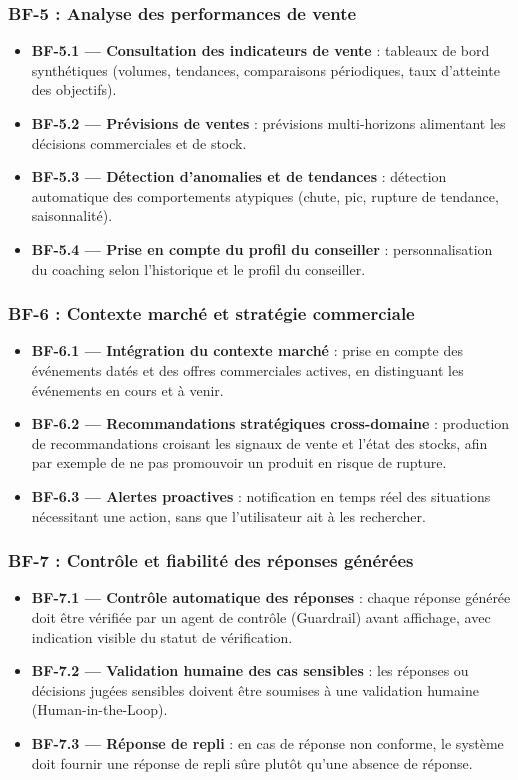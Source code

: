 \subsubsection*{BF-5 : Analyse des performances de vente}
\begin{itemize}[label=--]
    \item \textbf{BF-5.1 — Consultation des indicateurs de vente} : tableaux de bord synthétiques (volumes, tendances, comparaisons périodiques, taux d'atteinte des objectifs).
    \item \textbf{BF-5.2 — Prévisions de ventes} : prévisions multi-horizons alimentant les décisions commerciales et de stock.
    \item \textbf{BF-5.3 — Détection d'anomalies et de tendances} : détection automatique des comportements atypiques (chute, pic, rupture de tendance, saisonnalité).
    \item \textbf{BF-5.4 — Prise en compte du profil du conseiller} : personnalisation du coaching selon l'historique et le profil du conseiller.
\end{itemize}

\subsubsection*{BF-6 : Contexte marché et stratégie commerciale}
\begin{itemize}[label=--]
    \item \textbf{BF-6.1 — Intégration du contexte marché} : prise en compte des événements datés et des offres commerciales actives, en distinguant les événements en cours et à venir.
    \item \textbf{BF-6.2 — Recommandations stratégiques cross-domaine} : production de recommandations croisant les signaux de vente et l'état des stocks, afin par exemple de ne pas promouvoir un produit en risque de rupture.
    \item \textbf{BF-6.3 — Alertes proactives} : notification en temps réel des situations nécessitant une action, sans que l'utilisateur ait à les rechercher.
\end{itemize}

\subsubsection*{BF-7 : Contrôle et fiabilité des réponses générées}
\begin{itemize}[label=--]
    \item \textbf{BF-7.1 — Contrôle automatique des réponses} : chaque réponse générée doit être vérifiée par un agent de contrôle (Guardrail) avant affichage, avec indication visible du statut de vérification.
    \item \textbf{BF-7.2 — Validation humaine des cas sensibles} : les réponses ou décisions jugées sensibles doivent être soumises à une validation humaine (Human-in-the-Loop).
    \item \textbf{BF-7.3 — Réponse de repli} : en cas de réponse non conforme, le système doit fournir une réponse de repli sûre plutôt qu'une absence de réponse.
\end{itemize}

